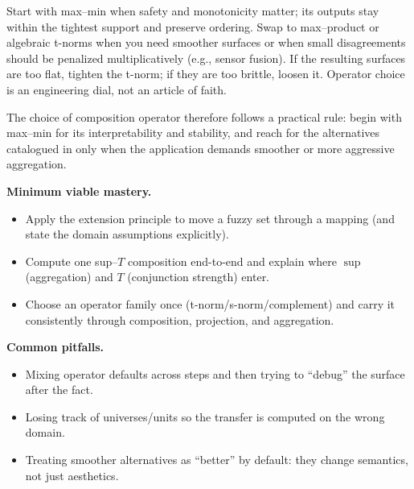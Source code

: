 \begin{tcolorbox}[summarybox, title={Author's note: choosing an operator family}]
Start with max--min when safety and monotonicity matter; its outputs stay within the tightest support and preserve ordering. Swap to max--product or algebraic t\hyp{}norms when you need smoother surfaces or when small disagreements should be penalized multiplicatively (e.g., sensor fusion). If the resulting surfaces are too flat, tighten the t\hyp{}norm; if they are too brittle, loosen it. Operator choice is an engineering dial, not an article of faith.
\end{tcolorbox}

The choice of composition operator therefore follows a practical rule: begin with max--min for its interpretability and stability, and reach for the alternatives catalogued in  only when the application demands smoother or more aggressive aggregation.

\begin{tcolorbox}[summarybox, title={Key takeaways}]
\textbf{Minimum viable mastery.}
\begin{itemize}
    \item Apply the extension principle to move a fuzzy set through a mapping (and state the domain assumptions explicitly).
    \item Compute one sup--\(T\) composition end-to-end and explain where \(\sup\) (aggregation) and \(T\) (conjunction strength) enter.
    \item Choose an operator family once (t\hyp{}norm/s\hyp{}norm/complement) and carry it consistently through composition, projection, and aggregation.
\end{itemize}

\medskip
\noindent\textbf{Common pitfalls.}
\begin{itemize}
    \item Mixing operator defaults across steps and then trying to ``debug'' the surface after the fact.
    \item Losing track of universes/units so the transfer is computed on the wrong domain.
    \item Treating smoother alternatives as ``better'' by default: they change semantics, not just aesthetics.
\end{itemize}
\end{tcolorbox}

